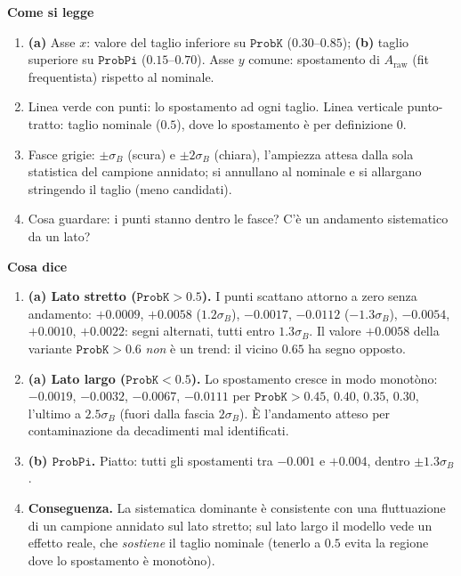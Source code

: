 \documentclass[10.5pt,a4paper]{article}
\newcommand{\Araw}{A_{\mathrm{raw}}}
\newcommand{\sez}[1]{\par\Needspace{6\baselineskip}\medskip\noindent\textbf{\large #1}\par\nopagebreak\smallskip}
\begin{document}
\sez{Come si legge}
\begin{enumerate}
\item \textbf{(a)} Asse $x$: valore del taglio inferiore su $\mathtt{ProbK}$ ($0.30$--$0.85$); \textbf{(b)} taglio superiore su $\mathtt{ProbPi}$ ($0.15$--$0.70$). Asse $y$ comune: spostamento di $\Araw$ (fit frequentista) rispetto al nominale.
\item Linea verde con punti: lo spostamento ad ogni taglio. Linea verticale punto-tratto: taglio nominale ($0.5$), dove lo spostamento è per definizione $0$.
\item Fasce grigie: $\pm\sigma_B$ (scura) e $\pm2\sigma_B$ (chiara), l'ampiezza attesa dalla sola statistica del campione annidato; si annullano al nominale e si allargano stringendo il taglio (meno candidati).
\item Cosa guardare: i punti stanno dentro le fasce? C'è un andamento sistematico da un lato?
\end{enumerate}

\sez{Cosa dice}
\begin{enumerate}
\item \textbf{(a) Lato stretto ($\mathtt{ProbK}>0.5$).} I punti scattano attorno a zero senza andamento: $+0.0009$, $+0.0058$ ($1.2\sigma_B$), $-0.0017$, $-0.0112$ ($-1.3\sigma_B$), $-0.0054$, $+0.0010$, $+0.0022$: segni alternati, tutti entro $1.3\sigma_B$. Il valore $+0.0058$ della variante $\mathtt{ProbK}>0.6$ \emph{non} è un trend: il vicino $0.65$ ha segno opposto.
\item \textbf{(a) Lato largo ($\mathtt{ProbK}<0.5$).} Lo spostamento cresce in modo monotòno: $-0.0019$, $-0.0032$, $-0.0067$, $-0.0111$ per $\mathtt{ProbK}>0.45$, $0.40$, $0.35$, $0.30$, l'ultimo a $2.5\sigma_B$ (fuori dalla fascia $2\sigma_B$). È l'andamento atteso per contaminazione da decadimenti mal identificati.
\item \textbf{(b) $\mathtt{ProbPi}$.} Piatto: tutti gli spostamenti tra $-0.001$ e $+0.004$, dentro $\pm1.3\sigma_B$.
\item \textbf{Conseguenza.} La sistematica dominante è consistente con una fluttuazione di un campione annidato sul lato stretto; sul lato largo il modello vede un effetto reale, che \emph{sostiene} il taglio nominale (tenerlo a $0.5$ evita la regione dove lo spostamento è monotòno).
\end{enumerate}
\end{document}
